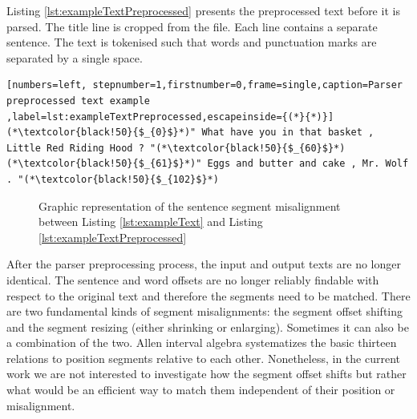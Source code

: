 Listing \ref{lst:exampleTextPreprocessed} presents the preprocessed text before it is parsed. The title line is cropped from the file. Each line contains a separate sentence. The text is tokenised such that words and punctuation marks are separated by a single space.

\begin{lstlisting}[numbers=left, stepnumber=1,firstnumber=0,frame=single,caption=Parser preprocessed text example ,label=lst:exampleTextPreprocessed,escapeinside={(*}{*)}]
(*\textcolor{black!50}{$_{0}$}*)" What have you in that basket , Little Red Riding Hood ? "(*\textcolor{black!50}{$_{60}$}*)
(*\textcolor{black!50}{$_{61}$}*)" Eggs and butter and cake , Mr. Wolf . "(*\textcolor{black!50}{$_{102}$}*)
\end{lstlisting}

\begin{figure}[!ht]
    \centering
    \caption{Graphic representation of the sentence segment misalignment between Listing \ref{lst:exampleText} and Listing \ref{lst:exampleTextPreprocessed} }
    \label{fig:segment-misalignment}
\end{figure}

After the parser preprocessing process, the input and output texts are no longer identical. The sentence and word offsets are no longer reliably findable with respect to the original text and therefore the segments need to be matched. There are two fundamental kinds of segment misalignments: the segment offset shifting and the segment resizing (either shrinking or enlarging). Sometimes it can also be a combination of the two. Allen interval algebra \citep{Allen1983} systematizes the basic thirteen relations to position segments relative to each other. Nonetheless, in the current work we are not interested to investigate how the segment offset shifts but rather what would be an efficient way to match them independent of their position or misalignment.

